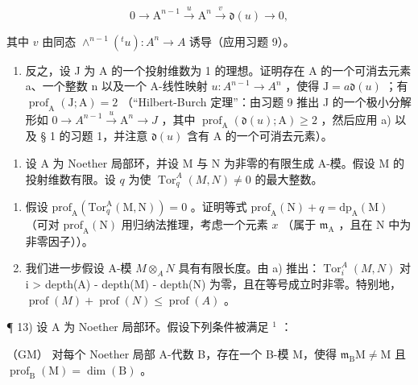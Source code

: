 \[
0 \rightarrow \mathrm{A} ^ {n - 1} \xrightarrow {u} \mathrm{A} ^ {n} \xrightarrow {v} \mathfrak {d} (u) \rightarrow 0,
\]

其中 \(v\) 由同态 \(\wedge^{n-1}(^t u): A^n \to A\) 诱导（应用习题 9）。

\begin{enumerate}
\def\labelenumi{\alph{enumi})}
\setcounter{enumi}{1}
\tightlist
\item
  反之，设 J 为 A 的一个投射维数为 1 的理想。证明存在 A 的一个可消去元素 a、一个整数 n 以及一个 A-线性映射 \(u: A^{n-1} \to A^n\) ，使得 \(\mathrm{J} = a\mathfrak{d}(u)\) ；有 \(\operatorname{prof}_{\mathrm{A}}(\mathrm{J}; \mathrm{A}) = 2\) （“Hilbert-Burch 定理”：由习题 9 推出 J 的一个极小分解形如 \(0 \to A^{n-1} \xrightarrow{u} \mathrm{A}^n \to J\) ，其中 \(\operatorname{prof}_{\mathrm{A}}(\mathfrak{d}(u); \mathrm{A}) \geqslant 2\) ，然后应用 a) 以及 § 1 的习题 1，并注意 \(\mathfrak{d}(u)\) 含有 A 的一个可消去元素）。
\end{enumerate}

\begin{enumerate}
\def\labelenumi{\arabic{enumi})}
\setcounter{enumi}{11}
\tightlist
\item
  设 A 为 Noether 局部环，并设 M 与 N 为非零的有限生成 \(\mathrm{A}\)-模。假设 M 的投射维数有限。设 \(q\) 为使 \(\operatorname{Tor}_q^A(M, N) \neq 0\) 的最大整数。
\end{enumerate}

\begin{enumerate}
\def\labelenumi{\alph{enumi})}
\item
  假设 \(\mathrm{prof}_{\mathrm{A}}(\mathrm{Tor}_{q}^{\mathrm{A}}(\mathrm{M},\mathrm{N})) = 0\) 。证明等式 \(\mathrm{prof}_{\mathrm{A}}(\mathrm{N}) + q = \mathrm{dp}_{\mathrm{A}}(\mathrm{M})\) （可对 \(\mathrm{prof}_{\mathrm{A}}(\mathrm{N})\) 用归纳法推理，考虑一个元素 \(x\) （属于 \(\mathfrak{m}_{\mathrm{A}}\) ，且在 N 中为非零因子））。
\item
  我们进一步假设 A-模 \(M \otimes_{A} N\) 具有有限长度。由 a) 推出：\(\operatorname{Tor}_{i}^{A}(M, N)\) 对 i \textgreater{} depth(A) - depth(M) - depth(N) 为零，且在等号成立时非零。特别地，\(\operatorname{prof}(M) + \operatorname{prof}(N) \leqslant \operatorname{prof}(A)\) 。
\end{enumerate}

¶ 13) 设 A 为 Noether 局部环。假设下列条件被满足 \(^{1}\) ：

（GM） 对每个 Noether 局部 A-代数 B，存在一个 B-模 M，使得 \(\mathfrak{m}_{\mathrm{B}}\mathrm{M}\neq\mathrm{M}\) 且 \(\operatorname{prof}_{\mathrm{B}}(\mathrm{M})=\dim(\mathrm{B})\) 。

